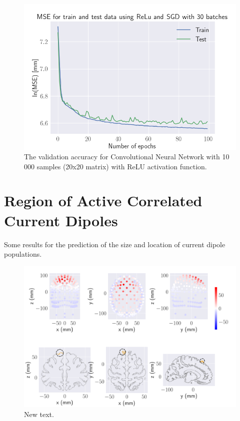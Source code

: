 \documentclass[a4paper, UKenglish, 11pt]{uiomaster}
\begin{document}
\begin{figure}[!htb]
    \centering
    \includegraphics[width=\linewidth]{../Code/plots/finals/MSE_CNN_dipoles_2_interpolated_CNN_20x20_10000_ReLu_and_SGD_30_100.png}
    \caption{The validation accuracy for Convolutional Neural Network with 10 000 samples (20x20 matrix) with ReLU activation function. }
    \label{fig:single_dipole_accuracy_CNN_2d}
\end{figure}



\section{Region of Active Correlated Current Dipoles}

Some results for the prediction of the size and location of current dipole populations.

\begin{figure}[!htb]
    \centering
    \includegraphics[width=\linewidth]{../Code/plots/finals/new_dipole_area_reduced_0.pdf}
    \caption{New text.}
    \label{fig:dipole_area}
\end{figure}
\end{document}
